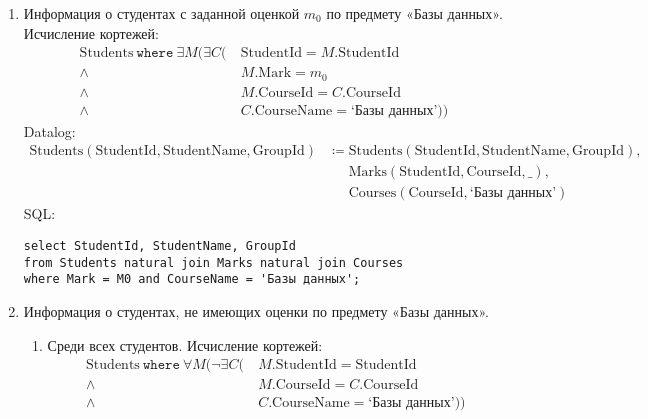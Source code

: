 \documentclass{article}
\newcommand{\Students}{\mathrm{Students}}
\newcommand{\StudentId}{\mathrm{StudentId}}
\newcommand{\StudentName}{\mathrm{StudentName}}
\newcommand{\GroupId}{\mathrm{GroupId}}
\newcommand{\Courses}{\mathrm{Courses}}
\newcommand{\CourseId}{\mathrm{CourseId}}
\newcommand{\CourseName}{\mathrm{CourseName}}
\newcommand{\Marks}{\mathrm{Marks}}
\newcommand{\Mark}{\mathrm{Mark}}
\newcommand{\select}{\mathtt{select}~}
\newcommand{\from}{~\mathtt{from}~}
\newcommand{\where}{~\mathtt{where}~}
\newcommand{\poloneq}{\mathrel{\phantom{\coloneq}}}
\begin{document}
\begin{enumerate}
    \item Информация о студентах с заданной оценкой $m_0$ по предмету «Базы данных».
    Исчисление кортежей:
    \begin{align*}
        \Students \where \exists M (\exists C
        (&\ \StudentId = M.\StudentId \\
            \land&\ M.\Mark = m_0 \\
            \land&\ M.\CourseId = C.\CourseId \\
            \land&\ C.\CourseName = \text{`Базы данных'}))
    \end{align*}
    Datalog:
    \begin{align*}
        \Students(\StudentId, \StudentName, \GroupId)
        &\coloneq \Students(\StudentId, \StudentName, \GroupId), \\
        &\poloneq \Marks(\StudentId, \CourseId, \_), \\
        &\poloneq \Courses(\CourseId, \text{`Базы данных'})
    \end{align*}
    SQL:
    \begin{verbatim}
select StudentId, StudentName, GroupId
from Students natural join Marks natural join Courses
where Mark = M0 and CourseName = 'Базы данных';
    \end{verbatim}
    \item Информация о студентах, не имеющих оценки по предмету «Базы данных».
    \begin{enumerate}
        \item Среди всех студентов.
        Исчисление кортежей:
        \begin{align*}
            \Students \where \forall M (\neg \exists C
            (&\ M.\StudentId = \StudentId \\
                \land&\  M.\CourseId = C.\CourseId \\
                \land&\  C.\CourseName = \text{`Базы данных'}))

\end{align*}
\end{enumerate}
\end{enumerate}
\end{document}
